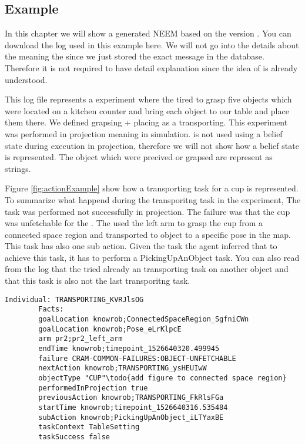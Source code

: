 \subsection{Example}
	\label{ch:example}
	In this chapter we will show a generated NEEM based on the version \neemversion.
	You can download the log used in this example here.	
	We will not go into the details about the \neemexp meaning the \tf since we just stored the exact \tf message in the database.
	Therefore it is not required to have detail explanation since the idea of \tf is already understood.
	
	This log file represents a experiment where the \pr tired to grasp five objects which were located on a kitchen counter and bring each object to our table and place them there.
	We defined grapsing + placing as a transporting.
	This experiment was performed in projection meaning in simulation.
	\cram is not used using a belief state during execution in projection, therefore we will not show how a belief state is represented.
	The object which were precived or grapsed are represent as strings.
	
	Figure \ref{fig:actionExample} show how a transporting task for a cup is represented.
	To summarize what happend during the transporitng task in the experiment,
	The task was performed not successfully in projection. 
	The failure was that the cup was unfetchable for the \pr.
	The \pr used the left arm to grasp the cup from a connected space region and transported to object to a specific pose in the map.
	This task has also one sub action. 
	Given the task the agent inferred that to achieve this task, it has to perform a PickingUpAnObject task.
	You can also read from the log that the  tried already an transporting task on another object and that this task is also not the last transporitng task.
	
	\begin{minipage}{\textwidth}
		\scriptsize
		\begin{lstlisting}[frame=single]
		Individual: TRANSPORTING_KVRJlsOG
		Facts: 
		goalLocation knowrob;ConnectedSpaceRegion_SgfniCWn
		goalLocation knowrob;Pose_eLrKlpcE
		arm pr2;pr2_left_arm
		endTime knowrob;timepoint_1526640320.499945
		failure CRAM-COMMON-FAILURES:OBJECT-UNFETCHABLE
		nextAction knowrob;TRANSPORTING_ysHEUIwW
		objectType "CUP"\todo{add figure to connected space region}
		performedInProjection true
		previousAction knowrob;TRANSPORTING_FkRlsFGa
		startTime knowrob;timepoint_1526640316.535484
		subAction knowrob;PickingUpAnObject_iLTYaxBE
		taskContext TableSetting
		taskSuccess false
		\end{lstlisting}

		\label{fig:actionExample}
	\end{minipage}
			\vspace{0.5mm}	
	
